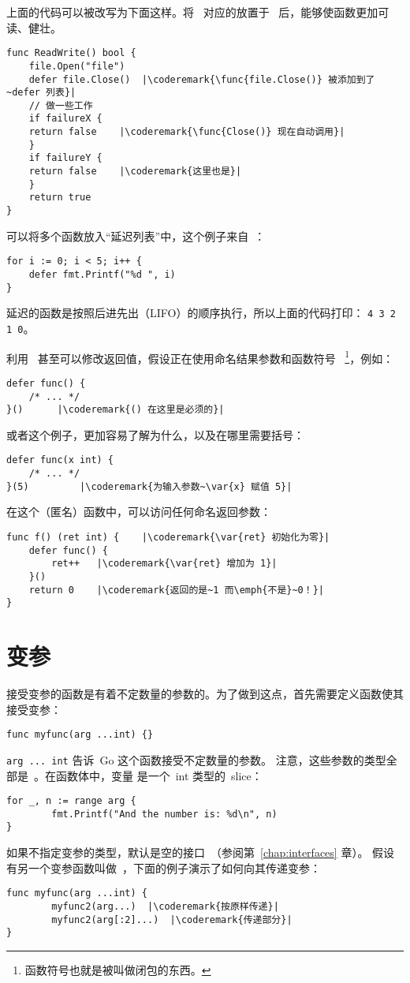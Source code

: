 上面的代码可以被改写为下面这样。将~ 对应的放置于~ 
后，能够使函数更加可读、健壮。
\begin{lstlisting}[caption=With defer]
func ReadWrite() bool {
    file.Open("file")
    defer file.Close()	|\coderemark{\func{file.Close()} 被添加到了~defer 列表}|
    // 做一些工作
    if failureX {
	return false    |\coderemark{\func{Close()} 现在自动调用}|
    }
    if failureY {
	return false    |\coderemark{这里也是}|
    }
    return true
}
\end{lstlisting}

可以将多个函数放入``延迟列表''中，这个例子来自~\cite{effective_go}：
\begin{lstlisting}
for i := 0; i < 5; i++ { 
    defer fmt.Printf("%d ", i) 
} 
\end{lstlisting}
延迟的函数是按照后进先出（LIFO）的顺序执行，所以上面的代码打印：
\lstinline{4 3 2 1 0}。

利用~ 甚至可以修改返回值，假设正在使用命名结果参数和函数符号
~\footnote{函数符号也就是被叫做闭包的东西。}，例如：
\begin{lstlisting}[caption=函数符号]
defer func() {
	/* ... */
}()		 |\coderemark{() 在这里是必须的}|
\end{lstlisting}
或者这个例子，更加容易了解为什么，以及在哪里需要括号：
\begin{lstlisting}[caption=带参数的函数符号]
defer func(x int) {
	/* ... */
}(5)		 |\coderemark{为输入参数~\var{x} 赋值 5}|
\end{lstlisting}
在这个（匿名）函数中，可以访问任何命名返回参数：
\begin{lstlisting}[caption=在 defer 中访问返回值]
func f() (ret int) {    |\coderemark{\var{ret} 初始化为零}|
	defer func() {
		ret++	|\coderemark{\var{ret} 增加为 1}|
	}()
	return 0	|\coderemark{返回的是~1 而\emph{不是}~0！}|
}
\end{lstlisting}

\section{变参}
接受变参的函数是有着不定数量的参数的。为了做到这点，首先需要定义函数使其接受变参：
\begin{lstlisting}
func myfunc(arg ...int) {}
\end{lstlisting}
\lstinline{arg ... int} 告诉~Go 这个函数接受不定数量的参数。
注意，这些参数的类型全部是~。在函数体中，变量
 是一个~int 类型的~slice：
\begin{lstlisting}
for _, n := range arg {
        fmt.Printf("And the number is: %d\n", n)
}
\end{lstlisting}
如果不指定变参的类型，默认是空的接口~（参阅第~\ref{chap:interfaces} 章）。
假设有另一个变参函数叫做~，下面的例子演示了如何向其传递变参：
\begin{lstlisting}
func myfunc(arg ...int) {
        myfunc2(arg...)  |\coderemark{按原样传递}|
        myfunc2(arg[:2]...)  |\coderemark{传递部分}|
}
\end{lstlisting}

